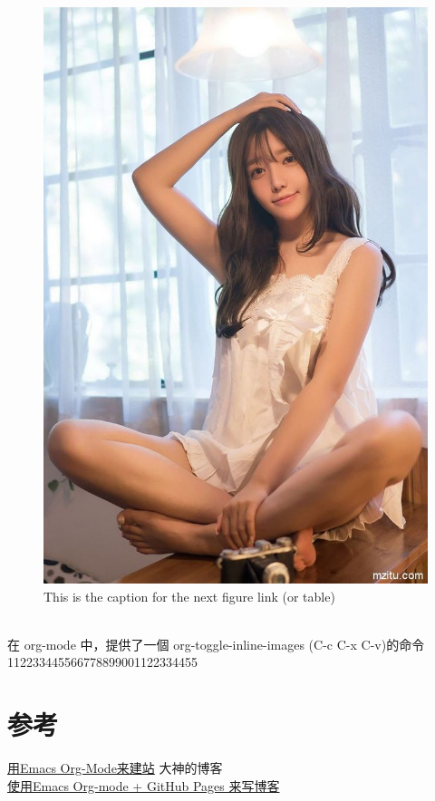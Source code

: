 \documentclass[11pt]{article}
\begin{document}
\begin{figure}[htb]
\centering
\includegraphics[width=.9\linewidth]{bbbb.jpg}
\caption{\label{fig:SED-HR4049}This is the caption for the next figure link (or table)}
\end{figure} \\

在 org-mode 中，提供了一個 org-toggle-inline-images (C-c C-x C-v)的命令 \\


112233445566778899001122334455 \\

\section{参考}
\label{sec-4}
\href{https://dirtysalt.github.io/html/blogs/use-emacs-org-mode-to-build-site.html}{用Emacs Org-Mode来建站} 大神的博客 \\
\href{http://forrestchang.com/14824097554043.html}{使用Emacs Org-mode + GitHub Pages 来写博客} \\
\end{document}

